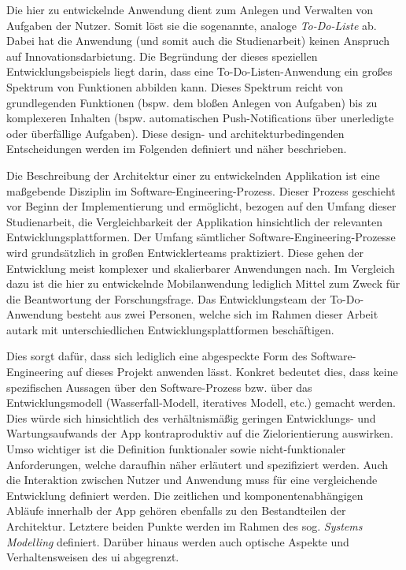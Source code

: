 
Die hier zu entwickelnde Anwendung dient zum Anlegen und Verwalten von Aufgaben der Nutzer. Somit löst sie die sogenannte, analoge \textit{To-Do-Liste} ab. Dabei hat die Anwendung (und somit auch die Studienarbeit) keinen Anspruch auf Innovationsdarbietung. Die Begründung der dieses speziellen Entwicklungsbeispiels liegt darin, dass eine To-Do-Listen-Anwendung ein großes Spektrum von Funktionen abbilden kann. Dieses Spektrum reicht von grundlegenden Funktionen (bspw. dem bloßen Anlegen von Aufgaben) bis zu komplexeren Inhalten (bspw. automatischen Push-Notifications über unerledigte oder überfällige Aufgaben). Diese design- und architekturbedingenden Entscheidungen werden im Folgenden definiert und näher beschrieben.

Die Beschreibung der Architektur einer zu entwickelnden Applikation ist eine maßgebende Disziplin im Software-Engineering-Prozess. Dieser Prozess geschieht vor Beginn der Implementierung und ermöglicht, bezogen auf den Umfang dieser Studienarbeit, die Vergleichbarkeit der Applikation hinsichtlich der relevanten Entwicklungsplattformen. Der Umfang sämtlicher Software-Engineering-Prozesse wird grundsätzlich in großen Entwicklerteams praktiziert. Diese gehen der Entwicklung meist komplexer und skalierbarer Anwendungen nach. Im Vergleich dazu ist die hier zu entwickelnde Mobilanwendung lediglich Mittel zum Zweck für die Beantwortung der Forschungsfrage. Das Entwicklungsteam der To-Do-Anwendung besteht aus zwei Personen, welche sich im Rahmen dieser Arbeit autark mit unterschiedlichen Entwicklungsplattformen beschäftigen.

Dies sorgt dafür, dass sich lediglich eine abgespeckte Form des Software-Engineering auf dieses Projekt anwenden lässt. Konkret bedeutet dies, dass keine spezifischen Aussagen über den Software-Prozess bzw. über das Entwicklungsmodell (Wasserfall-Modell, iteratives Modell, etc.) gemacht werden. Dies würde sich hinsichtlich des verhältnismäßig geringen Entwicklungs- und Wartungsaufwands der App kontraproduktiv auf die Zielorientierung auswirken. Umso wichtiger ist die Definition funktionaler sowie nicht-funktionaler Anforderungen, welche daraufhin näher erläutert und spezifiziert werden. Auch die Interaktion zwischen Nutzer und Anwendung muss für eine vergleichende Entwicklung definiert werden. Die zeitlichen und komponentenabhängigen Abläufe innerhalb der App gehören ebenfalls zu den Bestandteilen der Architektur. Letztere beiden Punkte werden im Rahmen des sog. \textit{Systems Modelling} definiert. Darüber hinaus werden auch optische Aspekte und Verhaltensweisen des \ac{ui} abgegrenzt.


